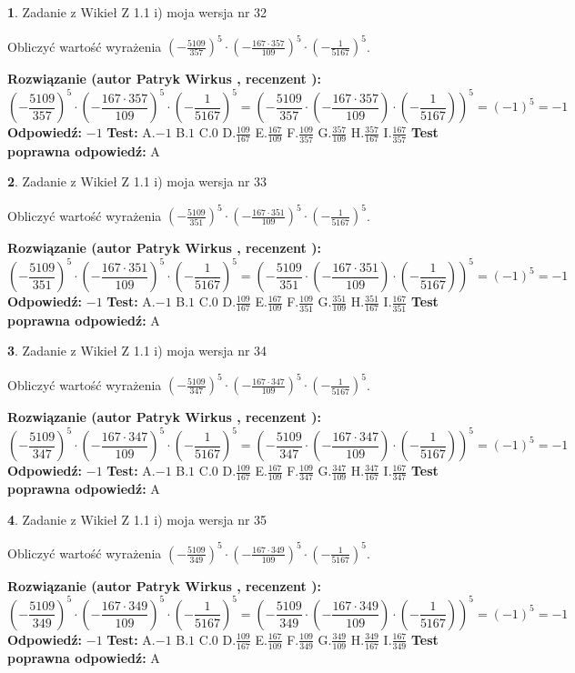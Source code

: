 \documentclass[12pt, a4paper]{article}
\theoremstyle{definition} %
\newtheorem{zad}{}
\newcommand{\zadStart}[1]{\begin{zad}#1\newline}
\newcommand{\zadStop}{\end{zad}}
\newcommand{\rozwStart}[2]{\noindent \textbf{Rozwiązanie (autor #1 , recenzent #2): }\newline}
\newcommand{\rozwStop}{\newline}
\newcommand{\odpStart}{\noindent \textbf{Odpowiedź:}\newline}
\newcommand{\odpStop}{\newline}
\newcommand{\testStart}{\noindent \textbf{Test:}\newline}
\newcommand{\testStop}{\newline}
\newcommand{\kluczStart}{\noindent \textbf{Test poprawna odpowiedź:}\newline}
\newcommand{\kluczStop}{\newline}
\begin{document}
\zadStart{Zadanie z Wikieł Z 1.1 i) moja wersja nr 32}

Obliczyć wartość wyrażenia $(-\frac{5109}{357})^{5} \cdot (-\frac{167 \cdot 357}{109})^{5} \cdot (-\frac{1}{5167})^{5}$.
\zadStop
\rozwStart{Patryk Wirkus}{}
$$(-\frac{5109}{357})^{5} \cdot (-\frac{167 \cdot 357}{109})^{5} \cdot (-\frac{1}{5167})^{5} = (-\frac{5109}{357} \cdot (-\frac{167 \cdot 357}{109}) \cdot (-\frac{1}{5167}))^{5} = (-1)^{5} = -1$$
\rozwStop
\odpStart
$-1$
\odpStop
\testStart
A.$-1$ B.$1$ C.$0$ D.$\frac{109}{167}$ E.$\frac{167}{109}$
F.$\frac{109}{357}$ G.$\frac{357}{109}$
H.$\frac{357}{167}$
I.$\frac{167}{357}$
\testStop
\kluczStart
A
\kluczStop



\zadStart{Zadanie z Wikieł Z 1.1 i) moja wersja nr 33}

Obliczyć wartość wyrażenia $(-\frac{5109}{351})^{5} \cdot (-\frac{167 \cdot 351}{109})^{5} \cdot (-\frac{1}{5167})^{5}$.
\zadStop
\rozwStart{Patryk Wirkus}{}
$$(-\frac{5109}{351})^{5} \cdot (-\frac{167 \cdot 351}{109})^{5} \cdot (-\frac{1}{5167})^{5} = (-\frac{5109}{351} \cdot (-\frac{167 \cdot 351}{109}) \cdot (-\frac{1}{5167}))^{5} = (-1)^{5} = -1$$
\rozwStop
\odpStart
$-1$
\odpStop
\testStart
A.$-1$ B.$1$ C.$0$ D.$\frac{109}{167}$ E.$\frac{167}{109}$
F.$\frac{109}{351}$ G.$\frac{351}{109}$
H.$\frac{351}{167}$
I.$\frac{167}{351}$
\testStop
\kluczStart
A
\kluczStop



\zadStart{Zadanie z Wikieł Z 1.1 i) moja wersja nr 34}

Obliczyć wartość wyrażenia $(-\frac{5109}{347})^{5} \cdot (-\frac{167 \cdot 347}{109})^{5} \cdot (-\frac{1}{5167})^{5}$.
\zadStop
\rozwStart{Patryk Wirkus}{}
$$(-\frac{5109}{347})^{5} \cdot (-\frac{167 \cdot 347}{109})^{5} \cdot (-\frac{1}{5167})^{5} = (-\frac{5109}{347} \cdot (-\frac{167 \cdot 347}{109}) \cdot (-\frac{1}{5167}))^{5} = (-1)^{5} = -1$$
\rozwStop
\odpStart
$-1$
\odpStop
\testStart
A.$-1$ B.$1$ C.$0$ D.$\frac{109}{167}$ E.$\frac{167}{109}$
F.$\frac{109}{347}$ G.$\frac{347}{109}$
H.$\frac{347}{167}$
I.$\frac{167}{347}$
\testStop
\kluczStart
A
\kluczStop



\zadStart{Zadanie z Wikieł Z 1.1 i) moja wersja nr 35}

Obliczyć wartość wyrażenia $(-\frac{5109}{349})^{5} \cdot (-\frac{167 \cdot 349}{109})^{5} \cdot (-\frac{1}{5167})^{5}$.
\zadStop
\rozwStart{Patryk Wirkus}{}
$$(-\frac{5109}{349})^{5} \cdot (-\frac{167 \cdot 349}{109})^{5} \cdot (-\frac{1}{5167})^{5} = (-\frac{5109}{349} \cdot (-\frac{167 \cdot 349}{109}) \cdot (-\frac{1}{5167}))^{5} = (-1)^{5} = -1$$
\rozwStop
\odpStart
$-1$
\odpStop
\testStart
A.$-1$ B.$1$ C.$0$ D.$\frac{109}{167}$ E.$\frac{167}{109}$
F.$\frac{109}{349}$ G.$\frac{349}{109}$
H.$\frac{349}{167}$
I.$\frac{167}{349}$
\testStop
\kluczStart
A
\kluczStop
\end{document}
